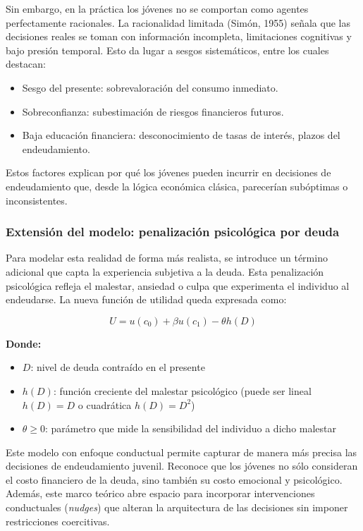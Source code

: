 \documentclass[10pt]{article}
\begin{document}
\begin{multicols}{2}
Sin embargo, en la práctica los jóvenes no se comportan como agentes perfectamente racionales. La racionalidad limitada (Simón, 1955) señala que las decisiones reales se toman con información incompleta, limitaciones cognitivas y bajo presión temporal. Esto da lugar a sesgos sistemáticos, entre los cuales destacan:

\begin{itemize}
    \item Sesgo del presente: sobrevaloración del consumo inmediato.
    \item Sobreconfianza: subestimación de riesgos financieros futuros.
    \item Baja educación financiera: desconocimiento de tasas de interés, plazos del endeudamiento.
\end{itemize}

Estos factores explican por qué los jóvenes pueden incurrir en decisiones de endeudamiento que, desde la lógica económica clásica, parecerían subóptimas o inconsistentes.

\subsubsection*{Extensión del modelo: penalización psicológica por deuda}

Para modelar esta realidad de forma más realista, se introduce un término adicional que capta la experiencia subjetiva a la deuda. Esta penalización psicológica refleja el malestar, ansiedad o culpa que experimenta el individuo al endeudarse. La nueva función de utilidad queda expresada como:

\begin{equation}
U = u(c_0) + \beta u(c_1) - \theta h(D)
\end{equation}

\noindent \textbf{Donde:}
\begin{itemize}
    \item $D$: nivel de deuda contraído en el presente
    \item $h(D)$: función creciente del malestar psicológico (puede ser lineal $h(D)=D$ o cuadrática $h(D)=D^2$)
    \item $\theta \geq 0$: parámetro que mide la sensibilidad del individuo a dicho malestar
\end{itemize}

Este modelo con enfoque conductual permite capturar de manera más precisa las decisiones de endeudamiento juvenil. Reconoce que los jóvenes no sólo consideran el costo financiero de la deuda, sino también su costo emocional y psicológico. Además, este marco teórico abre espacio para incorporar intervenciones conductuales (\textit{nudges}) que alteran la arquitectura de las decisiones sin imponer restricciones coercitivas.


\end{multicols}
\end{document}
